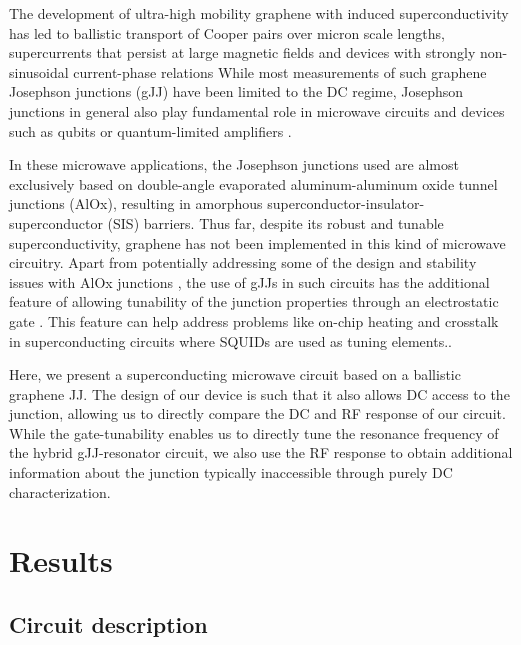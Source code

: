 \documentclass[preprint,
  onecolumn,
  notitlepage,
  amsmath,amssymb,
  aip,
  apl,
]{revtex4-1}
\begin{document}
\noindent The development of ultra-high mobility graphene with induced superconductivity has led to ballistic transport of Cooper pairs over micron scale lengths, supercurrents that persist at large magnetic fields and devices with strongly non-sinusoidal current-phase relations \cite{calado_ballistic_2015a,benshalom_quantum_2015,lee_ultimately_2015,novoselov_roadmap_2012,walsh_graphenebased_2017}
While most measurements of such graphene Josephson junctions (gJJ) have been limited to the DC regime, Josephson junctions in general also play fundamental role in microwave circuits and devices such as qubits or quantum-limited amplifiers \cite{martinis_course_2004,castellanos-beltran_development_2010}.

In these microwave applications, the Josephson junctions used are almost exclusively based on double-angle evaporated aluminum-aluminum oxide tunnel junctions (AlOx)\cite{dolan_offset_1977a}, resulting in amorphous superconductor-insulator-superconductor (SIS) barriers.
Thus far, despite its robust and tunable superconductivity, graphene has not been implemented in this kind of microwave circuitry.
Apart from potentially addressing some of the design and stability issues with AlOx junctions \cite{zeng_direct_2015, zeng_atomic_2016a}, the use of gJJs in such circuits has the additional feature of allowing tunability of the junction properties through an electrostatic gate \cite{calado_ballistic_2015a,benshalom_quantum_2015,lee_ultimately_2015,larsen_semiconductornanowirebased_2015,delange_realization_2015}.
This feature can help address problems like on-chip heating and crosstalk in superconducting circuits where SQUIDs are used as tuning elements.\cite{schreier_suppressing_2008a,sandberg_tuning_2008}.

Here, we present a superconducting microwave circuit based on a ballistic graphene JJ.
The design of our device is such that it also allows DC access to the junction, allowing us to directly compare the DC and RF response of our circuit.
While the gate-tunability enables us to directly tune the resonance frequency of the hybrid gJJ-resonator circuit, we also use the RF response to obtain additional information about the junction typically inaccessible through purely DC characterization.

\section{Results}

\subsection{Circuit description}
\end{document}
